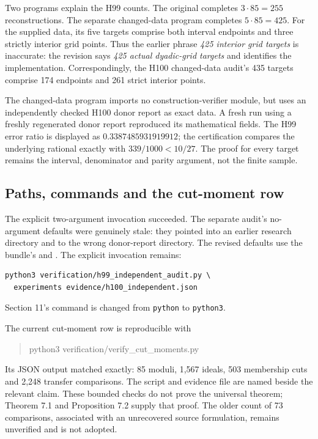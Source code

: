 \documentclass[11pt]{article}
\begin{document}
Two programs explain the H99 counts. The original
 completes
\(3\cdot85=255\) reconstructions. The separate changed-data program
completes \(5\cdot85=425\). For the supplied data, its five targets
comprise both interval endpoints and three strictly interior grid points.
Thus the earlier phrase \emph{425 interior grid targets} is inaccurate:
the revision says \emph{425 actual dyadic-grid targets} and identifies
the implementation. Correspondingly, the H100 changed-data audit's
435 targets comprise 174 endpoints and 261 strict interior points.

The changed-data program imports no construction-verifier module, but
uses an independently checked H100 donor report as exact data. A fresh
run using a freshly regenerated donor report reproduced its mathematical
fields. The H99 error ratio is displayed as
\(0.3387485931919912\); the certification compares the underlying
rational exactly with \(339/1000<10/27\).
The proof for every target remains the interval, denominator and
parity argument, not the finite sample.

\subsection*{Paths, commands and the cut-moment row}
The explicit two-argument invocation succeeded. The separate audit's
no-argument defaults were genuinely stale: they pointed into an earlier
research directory and to the wrong donor-report directory.
The revised defaults use the bundle's
 and .
The explicit invocation remains:
\begin{lstlisting}
python3 verification/h99_independent_audit.py \
  experiments evidence/h100_independent.json
\end{lstlisting}
Section 11's command is changed from \texttt{python} to \texttt{python3}.

The current cut-moment row is reproducible with
\begin{quote}\small\ttfamily
python3 verification/verify\_cut\_moments.py
\end{quote}
Its JSON output matched  exactly:
85 moduli, 1,567 ideals, 503 membership cuts and 2,248 transfer
comparisons. The script and evidence file are named beside the relevant
claim. These bounded checks do not prove the universal theorem;
Theorem 7.1 and Proposition 7.2 supply that proof.
The older count of 73 comparisons, associated with an unrecovered
source formulation, remains unverified and is not adopted.
\end{document}
